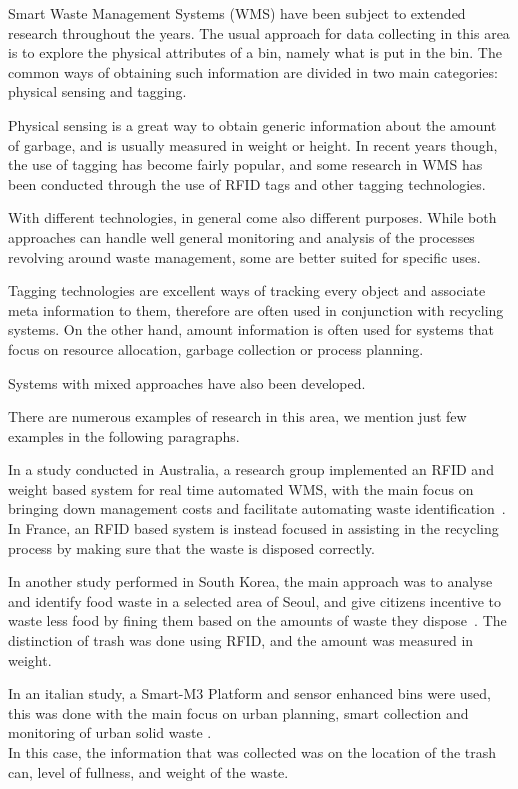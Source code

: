Smart Waste Management Systems (WMS) have been subject to extended research throughout the years.
The usual approach for data collecting in this area is to explore the physical attributes of a bin, namely what is put in the bin.
The common ways of obtaining such information are divided in two main categories: physical sensing and tagging.

Physical sensing is a great way to obtain generic information about the amount of garbage, and is usually measured in weight or height.
In recent years though, the use of tagging has become fairly popular, and some research in WMS has been conducted through the use of RFID tags and other tagging technologies.

With different technologies, in general come also different purposes.
While both approaches can handle well general monitoring and analysis of the processes revolving around waste management, some are better suited for specific uses.

Tagging technologies are excellent ways of tracking every object and associate meta information to them, therefore are often used in conjunction with recycling systems.
On the other hand, amount information is often used for systems that focus on resource allocation, garbage collection or process planning.

Systems with mixed approaches have also been developed.

There are numerous examples of research in this area, we mention just few examples in the following paragraphs.

In a study conducted in Australia, a research group implemented an RFID and weight based system for real time automated WMS, with the main focus on bringing down management costs and facilitate automating waste identification~\cite{australia}.
In France, an RFID based system is instead focused in assisting in the recycling process by making sure that the waste is disposed correctly\cite{france}.

In another study performed in South Korea, the main approach was to analyse and identify food waste in a selected area of Seoul, and give citizens incentive to waste less food by fining them based on the amounts of waste they dispose~\cite{korea}. The distinction of trash was done using RFID, and the amount was measured in weight.

In an italian study, a Smart-M3 Platform and sensor enhanced bins were used, this was done with the main focus on urban planning, smart collection and  monitoring of urban solid waste \cite{catania}.\\
In this case, the information that was collected was on the location of the trash can, level of fullness, and weight of the waste.


